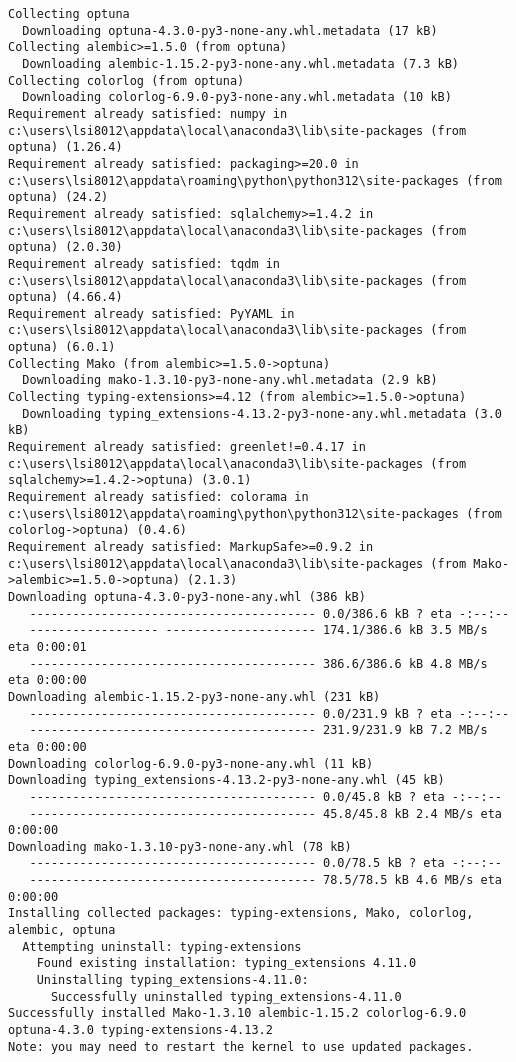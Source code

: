 \documentclass[
  letterpaper,
  DIV=11,
  numbers=noendperiod]{scrreprt}
\begin{document}
\begin{verbatim}
Collecting optuna
  Downloading optuna-4.3.0-py3-none-any.whl.metadata (17 kB)
Collecting alembic>=1.5.0 (from optuna)
  Downloading alembic-1.15.2-py3-none-any.whl.metadata (7.3 kB)
Collecting colorlog (from optuna)
  Downloading colorlog-6.9.0-py3-none-any.whl.metadata (10 kB)
Requirement already satisfied: numpy in c:\users\lsi8012\appdata\local\anaconda3\lib\site-packages (from optuna) (1.26.4)
Requirement already satisfied: packaging>=20.0 in c:\users\lsi8012\appdata\roaming\python\python312\site-packages (from optuna) (24.2)
Requirement already satisfied: sqlalchemy>=1.4.2 in c:\users\lsi8012\appdata\local\anaconda3\lib\site-packages (from optuna) (2.0.30)
Requirement already satisfied: tqdm in c:\users\lsi8012\appdata\local\anaconda3\lib\site-packages (from optuna) (4.66.4)
Requirement already satisfied: PyYAML in c:\users\lsi8012\appdata\local\anaconda3\lib\site-packages (from optuna) (6.0.1)
Collecting Mako (from alembic>=1.5.0->optuna)
  Downloading mako-1.3.10-py3-none-any.whl.metadata (2.9 kB)
Collecting typing-extensions>=4.12 (from alembic>=1.5.0->optuna)
  Downloading typing_extensions-4.13.2-py3-none-any.whl.metadata (3.0 kB)
Requirement already satisfied: greenlet!=0.4.17 in c:\users\lsi8012\appdata\local\anaconda3\lib\site-packages (from sqlalchemy>=1.4.2->optuna) (3.0.1)
Requirement already satisfied: colorama in c:\users\lsi8012\appdata\roaming\python\python312\site-packages (from colorlog->optuna) (0.4.6)
Requirement already satisfied: MarkupSafe>=0.9.2 in c:\users\lsi8012\appdata\local\anaconda3\lib\site-packages (from Mako->alembic>=1.5.0->optuna) (2.1.3)
Downloading optuna-4.3.0-py3-none-any.whl (386 kB)
   ---------------------------------------- 0.0/386.6 kB ? eta -:--:--
   ------------------ --------------------- 174.1/386.6 kB 3.5 MB/s eta 0:00:01
   ---------------------------------------- 386.6/386.6 kB 4.8 MB/s eta 0:00:00
Downloading alembic-1.15.2-py3-none-any.whl (231 kB)
   ---------------------------------------- 0.0/231.9 kB ? eta -:--:--
   ---------------------------------------- 231.9/231.9 kB 7.2 MB/s eta 0:00:00
Downloading colorlog-6.9.0-py3-none-any.whl (11 kB)
Downloading typing_extensions-4.13.2-py3-none-any.whl (45 kB)
   ---------------------------------------- 0.0/45.8 kB ? eta -:--:--
   ---------------------------------------- 45.8/45.8 kB 2.4 MB/s eta 0:00:00
Downloading mako-1.3.10-py3-none-any.whl (78 kB)
   ---------------------------------------- 0.0/78.5 kB ? eta -:--:--
   ---------------------------------------- 78.5/78.5 kB 4.6 MB/s eta 0:00:00
Installing collected packages: typing-extensions, Mako, colorlog, alembic, optuna
  Attempting uninstall: typing-extensions
    Found existing installation: typing_extensions 4.11.0
    Uninstalling typing_extensions-4.11.0:
      Successfully uninstalled typing_extensions-4.11.0
Successfully installed Mako-1.3.10 alembic-1.15.2 colorlog-6.9.0 optuna-4.3.0 typing-extensions-4.13.2
Note: you may need to restart the kernel to use updated packages.
\end{verbatim}
\end{document}

